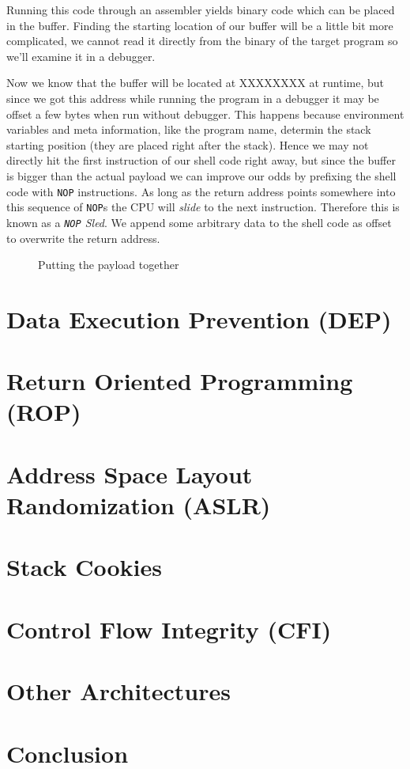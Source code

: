 \documentclass[article]{uibk}
\begin{document}
Running this code through an assembler yields binary code which can be placed
in the buffer. Finding the starting location of our buffer will be a little bit
more complicated, we cannot read it directly from the binary of the target
program so we'll examine it in a debugger.

Now we know that the buffer will be located at XXXXXXXX at runtime, but since
we got this address while running the program in a debugger it may be offset a
few bytes when run without debugger. This happens because environment variables
and meta information, like the program name, determin the stack starting
position (they are placed right after the stack). Hence we may not directly hit
the first instruction of our shell code right away, but since the buffer is
bigger than the actual payload we can improve our odds by prefixing the shell
code with \texttt{NOP} instructions. As long as the return address points
somewhere into this sequence of \texttt{NOP}s the CPU will \emph{slide} to the
next instruction. Therefore this is known as a \textit{\texttt{NOP} Sled}. We
append some arbitrary data to the shell code as offset to overwrite the return
address.

\begin{figure}[H]
    \centering
    
    \caption{Putting the payload together}
    \label{fig:shell_code}
\end{figure}

\newpage

\section{Data Execution Prevention (DEP)}

\section{Return Oriented Programming (ROP)}

\section{Address Space Layout Randomization (ASLR)}

\section{Stack Cookies}

\section{Control Flow Integrity (CFI)}

\section{Other Architectures}

\section{Conclusion}


\end{document}
